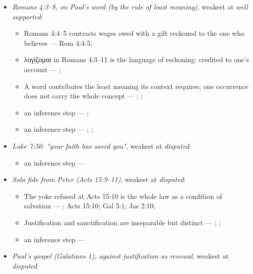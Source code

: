 \documentclass[11pt]{article}
\begin{document}
\begin{itemize}
\begin{itemize}
\end{itemize}
\item \emph{Romans 4:3–8, on Paul's word (by the rule of least meaning)}, weakest at \emph{well supported}:
\begin{itemize}
\item Romans 4:4–5 contrasts wages owed with a gift reckoned to the one who believes --- Rom 4:4-5; \cite[III.xi.18]{calvin-institutes-1960}
\item λογίζομαι in Romans 4:3–11 is the language of reckoning: credited to one's account --- \cite[s.v. λογίζομαι]{bauer-danker-lexicon-2000}; \cite[ad loc. Rom 4:3]{moo-romans-1996}
\item A word contributes the least meaning its context requires; one occurrence does not carry the whole concept --- \cite{silva-biblical-words-1994}; \cite{joos-semantic-axiom-1972}; \cite{barr-semantics-2004}
\item an inference step --- \cite[ad loc. Rom 4:6]{moo-romans-1996}; \cite[s.v. λογίζομαι]{bauer-danker-lexicon-2000}
\item an inference step --- \cite{silva-biblical-words-1994}; \cite[p. 80]{moo-romans-1996}; \cite{barr-semantics-2004}
\end{itemize}
\item \emph{Luke 7:50: "your faith has saved you"}, weakest at \emph{disputed}:
\begin{itemize}
\item an inference step --- \cite[Trent, Session VI (1547), canon 9]{tanner-decrees-1990}
\end{itemize}
\item \emph{Sola fide from Peter (Acts 15:9–11)}, weakest at \emph{disputed}:
\begin{itemize}
\item The yoke refused at Acts 15:10 is the whole law as a condition of salvation --- \cite[ad loc. Acts 15:10]{bruce-acts-1988}; Acts 15:10; Gal 5:1; Jas 2:10; \cite{das-paul-law-covenant-2001}
\item Justification and sanctification are inseparable but distinct --- \cite[XIII.1]{westminster-confession-1647}; \cite[XI.1]{westminster-confession-1647}; \cite[III.xi.6]{calvin-institutes-1960}
\item an inference step --- \cite[Trent, Session VI (1547), canon 9]{tanner-decrees-1990}
\end{itemize}
\item \emph{Paul's gospel (Galatians 1), against justification as renewal}, weakest at \emph{disputed}:

\end{itemize}
\end{document}
